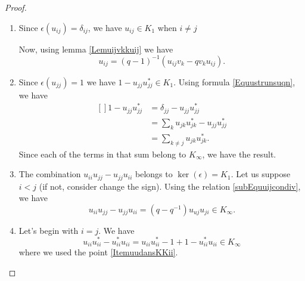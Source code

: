 \begin{proof}
    \begin{enumerate}
        \item
            Since $\epsilon(u_{ij})=\delta_{ij}$, we have $u_{ij}\in K_1$ when $i\neq j$

            Now, using lemma \ref{Lemuijvkkuij} we have
            \begin{equation}
                u_{ij}=(q-1)^{-1}(u_{ij}v_k-qv_ku_{ij}).
            \end{equation}
        \item
            Since $\epsilon(u_{jj})=1$ we have $1-u_{jj}u_{jj}^*\in K_1$. Using formula \eqref{Equustrunsuqn}, we have
            \begin{equation}
                \begin{aligned}[]
                    1-u_{jj}u_{jj}^*&=\delta_{jj}-u_{jj}u_{jj}^*\\
                    &=\sum_ku_{jk}u_{jk}^*-u_{jj}u_{jj}^*\\
                    &=\sum_{k\neq j}u_{jk}u_{jk}^*.
                    \end{aligned}
            \end{equation}
            Since each of the terms in that sum belong to $K_{\infty}$, we have the result.
        \item
            The combination $u_{ii}u_{jj}-u_{jj}u_{ii}$ belongs to $\ker(\epsilon)=K_1$. Let us suppose $i<j$ (if not, consider change the sign). Using the relation \eqref{subEquuijcondiv}, we have
            \begin{equation}
                u_{ii}u_{jj}-u_{jj}u_{ii}=(q-q^{-1})u_{uj}u_{ji}\in K_{\infty}.
            \end{equation}
        \item
            Let's begin with $i=j$. We have
            \begin{equation}
                u_{ii}u_{ii}^*-u_{ii}^*u_{ii}=u_{ii}u_{ii}^*-1+1-u_{ii}^*u_{ii}\in K_{\infty}
            \end{equation}
            where we used the point \ref{ItemuudansKKii}.


\end{enumerate}
\end{proof}
